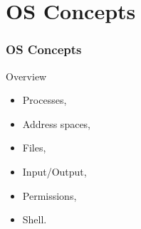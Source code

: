 \section{OS Concepts}
  \begin{frame}
    \frametitle{OS Concepts}
        \begin{block}{Overview}
          \begin{itemize}
            \item Processes,
            \item Address spaces,
            \item Files,
            \item Input/Output,
            \item Permissions,
            \item Shell.
          \end{itemize}
        \end{block}
  \end{frame}

